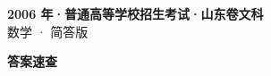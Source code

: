 \documentclass[zihao=-4, a4paper]{ctexart}
\begin{document}
\begin{center}
  {\Large\bfseries 2006 年·普通高等学校招生考试·山东卷文科}\\[4pt]
  {\large 数学 · 简答版}
\end{center}
\medskip
{}

\clearpage
{}
\begin{center}{\Large\bfseries 答案速查}\end{center}
\medskip

\end{document}
